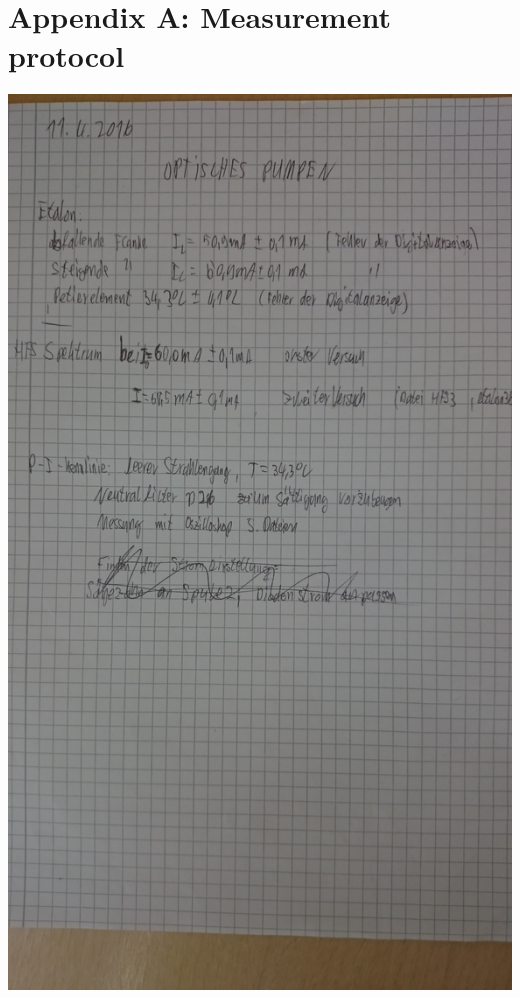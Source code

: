 \section{Appendix A: Measurement protocol}
\includegraphics[angle=-90,width=1.0\linewidth]{graphics/DSC_0086}
\newpage
